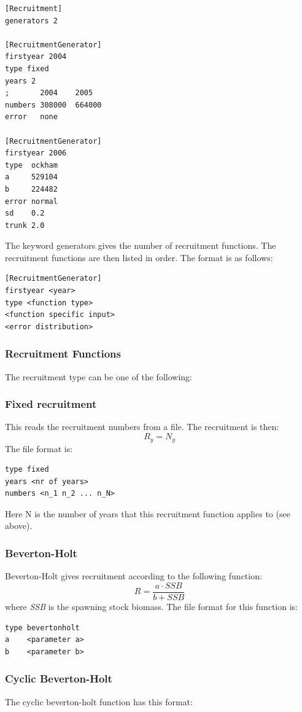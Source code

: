 \documentclass[12pt,twoside,a4paper]{article}
\begin{document}
\begin{verbatim}
[Recruitment]
generators 2

[RecruitmentGenerator]
firstyear 2004
type fixed
years 2
;       2004    2005   
numbers 308000  664000
error   none 

[RecruitmentGenerator]
firstyear 2006
type  ockham
a     529104
b     224482
error normal
sd    0.2
trunk 2.0
\end{verbatim}
The keyword generators gives the number of recruitment functions. The
recruitment functions are then listed in order. The format is as
follows:
\begin{verbatim}
[RecruitmentGenerator]
firstyear <year>
type <function type>
<function specific input>
<error distribution>
\end{verbatim}

\subsubsection{Recruitment Functions}
\label{recruitment}
The recruitment type can be one of the following:

\subsubsection*{Fixed recruitment}
This reads the recruitment numbers from a file. The recruitment is
then: 
\[R_y=N_y\]
The file format is:
\begin{verbatim}
type fixed
years <nr of years>
numbers <n_1 n_2 ... n_N>
\end{verbatim}
Here N is the number of years that this recruitment function applies
to (see above).

\subsubsection*{Beverton-Holt}
Beverton-Holt gives recruitment according to the following function:
\[R=\frac{a\cdot SSB}{b+SSB}\]
where \emph{SSB} is the spawning stock biomass. The file format for this
function is:
\begin{verbatim}
type bevertonholt
a    <parameter a>
b    <parameter b>
\end{verbatim}

\subsubsection*{Cyclic Beverton-Holt}
The cyclic beverton-holt function has this format:
\end{document}
